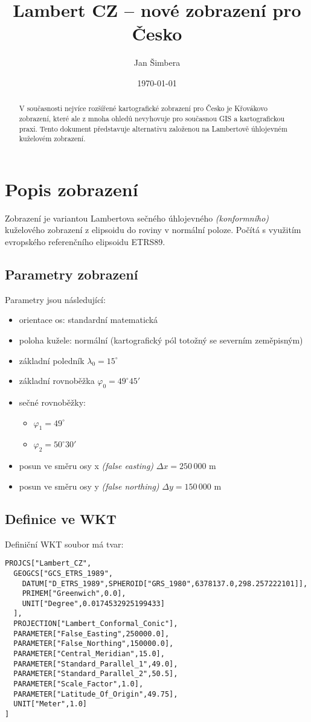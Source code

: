 \documentclass[a4paper]{article}
\title{Lambert CZ -- nové zobrazení pro Česko}
\date{\today}
\author{Jan Šimbera}
\newcommand{\dg}{^{\circ}}
\begin{document}
\maketitle
\begin{abstract}
V současnosti nejvíce rozšířené kartografické zobrazení pro Česko je Křovákovo zobrazení, které ale z mnoha ohledů nevyhovuje pro současnou GIS a kartografickou praxi. Tento dokument představuje alternativu založenou na Lambertově úhlojevném kuželovém zobrazení.
\end{abstract}

\section{Popis zobrazení}
Zobrazení je variantou Lambertova sečného úhlojevného \emph{(konformního)} kuželového zobrazení z elipsoidu do roviny v normální poloze. Počítá s využitím evropského referenčního elipsoidu ETRS89. 

\subsection{Parametry zobrazení}
Parametry jsou následující:
\begin{itemize}
  \item orientace os: standardní matematická
  \item poloha kužele: normální (kartografický pól totožný se severním zeměpisným)
  \item základní poledník $\lambda_0 = 15\dg$
  \item základní rovnoběžka $\varphi_0 = 49\dg 45'$
  \item sečné rovnoběžky:
    \begin{itemize}
      \item $\varphi_1 = 49\dg$
      \item $\varphi_2 = 50\dg 30'$
    \end{itemize}
  \item posun ve směru osy x \emph{(false easting)} $\Delta x = 250\,000$ m
  \item posun ve směru osy y \emph{(false northing)} $\Delta y = 150\,000$ m
\end{itemize}

\subsection{Definice ve WKT}
Definiční WKT soubor má tvar:
\begin{verbatim}
PROJCS["Lambert_CZ",
  GEOGCS["GCS_ETRS_1989",
    DATUM["D_ETRS_1989",SPHEROID["GRS_1980",6378137.0,298.257222101]],
    PRIMEM["Greenwich",0.0],
    UNIT["Degree",0.0174532925199433]
  ],
  PROJECTION["Lambert_Conformal_Conic"],
  PARAMETER["False_Easting",250000.0],
  PARAMETER["False_Northing",150000.0],
  PARAMETER["Central_Meridian",15.0],
  PARAMETER["Standard_Parallel_1",49.0],
  PARAMETER["Standard_Parallel_2",50.5],
  PARAMETER["Scale_Factor",1.0],
  PARAMETER["Latitude_Of_Origin",49.75],
  UNIT["Meter",1.0]
]
\end{verbatim}
\end{document}
